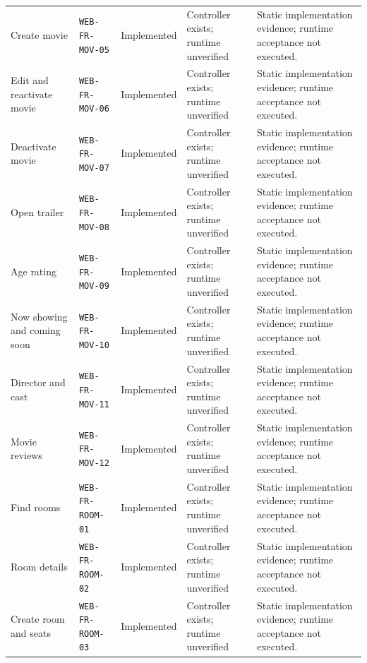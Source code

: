 \begin{longtable}{@{}P{0.19000\SRSWidth}P{0.18000\SRSWidth}P{0.15000\SRSWidth}P{0.20000\SRSWidth}P{0.28000\SRSWidth}@{}}
Create movie & \texttt{WEB-\allowbreak{}FR-\allowbreak{}MOV-\allowbreak{}05} & Implemented & Controller exists; runtime unverified & Static implementation evidence; runtime acceptance not executed. \\[3pt]
Edit and reactivate movie & \texttt{WEB-\allowbreak{}FR-\allowbreak{}MOV-\allowbreak{}06} & Implemented & Controller exists; runtime unverified & Static implementation evidence; runtime acceptance not executed. \\[3pt]
Deactivate movie & \texttt{WEB-\allowbreak{}FR-\allowbreak{}MOV-\allowbreak{}07} & Implemented & Controller exists; runtime unverified & Static implementation evidence; runtime acceptance not executed. \\[3pt]
Open trailer & \texttt{WEB-\allowbreak{}FR-\allowbreak{}MOV-\allowbreak{}08} & Implemented & Controller exists; runtime unverified & Static implementation evidence; runtime acceptance not executed. \\[3pt]
Age rating & \texttt{WEB-\allowbreak{}FR-\allowbreak{}MOV-\allowbreak{}09} & Implemented & Controller exists; runtime unverified & Static implementation evidence; runtime acceptance not executed. \\[3pt]
Now showing and coming soon & \texttt{WEB-\allowbreak{}FR-\allowbreak{}MOV-\allowbreak{}10} & Implemented & Controller exists; runtime unverified & Static implementation evidence; runtime acceptance not executed. \\[3pt]
Director and cast & \texttt{WEB-\allowbreak{}FR-\allowbreak{}MOV-\allowbreak{}11} & Implemented & Controller exists; runtime unverified & Static implementation evidence; runtime acceptance not executed. \\[3pt]
Movie reviews & \texttt{WEB-\allowbreak{}FR-\allowbreak{}MOV-\allowbreak{}12} & Implemented & Controller exists; runtime unverified & Static implementation evidence; runtime acceptance not executed. \\[3pt]
Find rooms & \texttt{WEB-\allowbreak{}FR-\allowbreak{}ROOM-\allowbreak{}01} & Implemented & Controller exists; runtime unverified & Static implementation evidence; runtime acceptance not executed. \\[3pt]
Room details & \texttt{WEB-\allowbreak{}FR-\allowbreak{}ROOM-\allowbreak{}02} & Implemented & Controller exists; runtime unverified & Static implementation evidence; runtime acceptance not executed. \\[3pt]
Create room and seats & \texttt{WEB-\allowbreak{}FR-\allowbreak{}ROOM-\allowbreak{}03} & Implemented & Controller exists; runtime unverified & Static implementation evidence; runtime acceptance not executed. \\[3pt]

\end{longtable}

